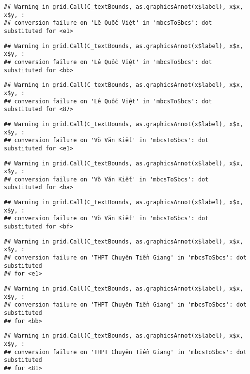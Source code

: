 \documentclass[
]{article}
\begin{document}
\begin{verbatim}
## Warning in grid.Call(C_textBounds, as.graphicsAnnot(x$label), x$x, x$y, :
## conversion failure on 'Lê Quốc Việt' in 'mbcsToSbcs': dot substituted for <e1>
\end{verbatim}

\begin{verbatim}
## Warning in grid.Call(C_textBounds, as.graphicsAnnot(x$label), x$x, x$y, :
## conversion failure on 'Lê Quốc Việt' in 'mbcsToSbcs': dot substituted for <bb>
\end{verbatim}

\begin{verbatim}
## Warning in grid.Call(C_textBounds, as.graphicsAnnot(x$label), x$x, x$y, :
## conversion failure on 'Lê Quốc Việt' in 'mbcsToSbcs': dot substituted for <87>
\end{verbatim}

\begin{verbatim}
## Warning in grid.Call(C_textBounds, as.graphicsAnnot(x$label), x$x, x$y, :
## conversion failure on 'Võ Văn Kiết' in 'mbcsToSbcs': dot substituted for <e1>
\end{verbatim}

\begin{verbatim}
## Warning in grid.Call(C_textBounds, as.graphicsAnnot(x$label), x$x, x$y, :
## conversion failure on 'Võ Văn Kiết' in 'mbcsToSbcs': dot substituted for <ba>
\end{verbatim}

\begin{verbatim}
## Warning in grid.Call(C_textBounds, as.graphicsAnnot(x$label), x$x, x$y, :
## conversion failure on 'Võ Văn Kiết' in 'mbcsToSbcs': dot substituted for <bf>
\end{verbatim}

\begin{verbatim}
## Warning in grid.Call(C_textBounds, as.graphicsAnnot(x$label), x$x, x$y, :
## conversion failure on 'THPT Chuyên Tiền Giang' in 'mbcsToSbcs': dot substituted
## for <e1>
\end{verbatim}

\begin{verbatim}
## Warning in grid.Call(C_textBounds, as.graphicsAnnot(x$label), x$x, x$y, :
## conversion failure on 'THPT Chuyên Tiền Giang' in 'mbcsToSbcs': dot substituted
## for <bb>
\end{verbatim}

\begin{verbatim}
## Warning in grid.Call(C_textBounds, as.graphicsAnnot(x$label), x$x, x$y, :
## conversion failure on 'THPT Chuyên Tiền Giang' in 'mbcsToSbcs': dot substituted
## for <81>
\end{verbatim}
\end{document}
